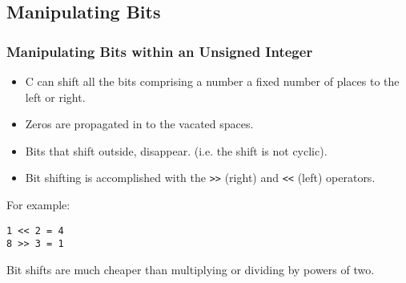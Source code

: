 \documentclass[smaller,table]{beamer} %
\begin{document}
\subsection{Manipulating Bits}
\begin{frame}
\frametitle{Manipulating Bits within an Unsigned Integer}
\begin{itemize}
\item C can shift all the bits comprising a number a fixed number of places to the left or right.
\item Zeros are propagated in to the vacated spaces.
\item Bits that shift outside, disappear. (i.e. the shift is not cyclic).
\item Bit shifting is accomplished with the {\tt >>} (right) and {\tt <<} (left) operators.
\end{itemize}
For example:
\begin{center}
\tt 1 << 2 = 4\\
\tt 8 >> 3 = 1
\end{center}
\begin{block}{}
Bit shifts are much cheaper than multiplying or dividing by powers of two.
\end{block}
\end{frame}
\end{document}
